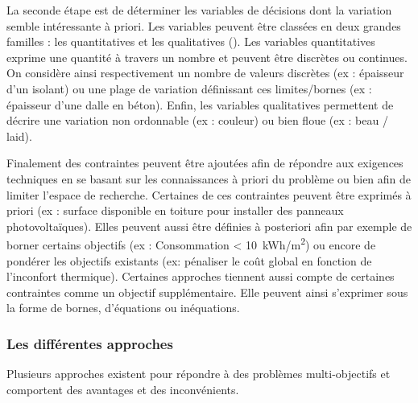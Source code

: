 La seconde étape est de déterminer les variables de décisions dont la variation
semble intéressante à priori. Les variables peuvent être classées en deux grandes
familles : les quantitatives et les qualitatives ().
Les variables quantitatives exprime une quantité à travers un nombre et
peuvent être discrètes ou continues. On considère ainsi respectivement un nombre de
valeurs discrètes (ex : épaisseur d’un isolant) ou une plage de variation définissant
ces limites/bornes (ex : épaisseur d’une dalle en béton).
Enfin, les variables qualitatives permettent de décrire une variation non ordonnable
(ex : couleur) ou bien floue (ex : beau / laid).

Finalement des contraintes peuvent être ajoutées afin de répondre aux exigences
techniques en se basant sur les connaissances à priori du problème ou bien afin de
limiter l’espace de recherche.
Certaines de ces contraintes peuvent être exprimés à priori (ex : surface disponible
en toiture pour installer des panneaux photovoltaïques). Elles peuvent aussi être définies
à posteriori afin par exemple de borner certains objectifs (ex : Consommation < 10~\si{kWh/m^{2}})
ou encore de pondérer les objectifs existants (ex: pénaliser le coût global en fonction de l’inconfort
thermique). Certaines approches tiennent aussi compte de certaines contraintes comme
un objectif supplémentaire.
Elle peuvent ainsi s’exprimer sous la forme de bornes, d’équations ou inéquations.


\subsubsection{Les différentes approches} %
\label{ssub:les_differentes_approches}
Plusieurs approches existent pour répondre à des problèmes multi-objectifs et
comportent des avantages et des inconvénients.

